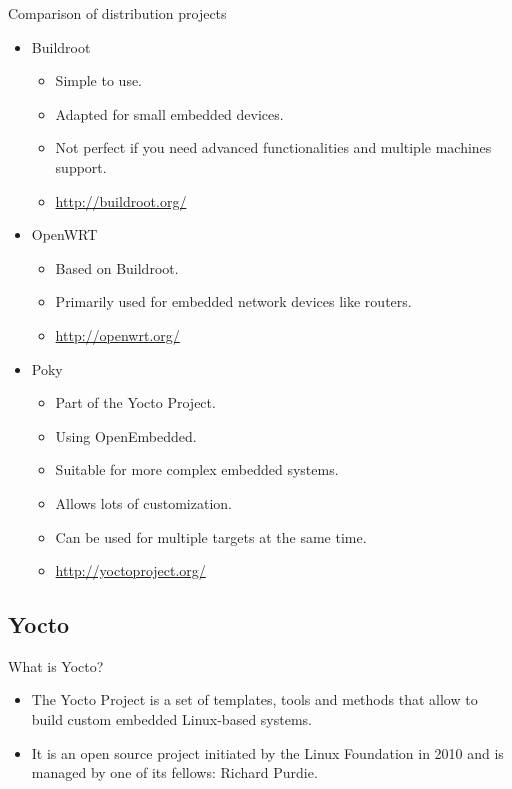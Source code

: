 \begin{corollary}{Comparison of distribution projects}
    \begin{itemize}
        \item Buildroot
        \begin{itemize}
            \item Simple to use.
            \item Adapted for small embedded devices.
            \item Not perfect if you need advanced functionalities and multiple machines support.
            \item \href{http://buildroot.org/}{http://buildroot.org/}
        \end{itemize}
        \item OpenWRT
        \begin{itemize}
            \item Based on Buildroot.
            \item Primarily used for embedded network devices like routers.
            \item \href{http://openwrt.org/}{http://openwrt.org/}
        \end{itemize}
        \item Poky
        \begin{itemize}
            \item Part of the Yocto Project.
            \item Using OpenEmbedded.
            \item Suitable for more complex embedded systems.
            \item Allows lots of customization.
            \item Can be used for multiple targets at the same time.
            \item \href{http://yoctoproject.org/}{http://yoctoproject.org/}
        \end{itemize}
    \end{itemize}
\end{corollary}

\subsection{Yocto}

\begin{definition}{What is Yocto?}
    \begin{itemize}
        \item The Yocto Project is a set of templates, tools and methods that allow to build custom embedded Linux-based systems.
        \item It is an open source project initiated by the Linux Foundation in 2010 and is managed by one of its fellows: Richard Purdie.
    \end{itemize}
    
\end{definition}

